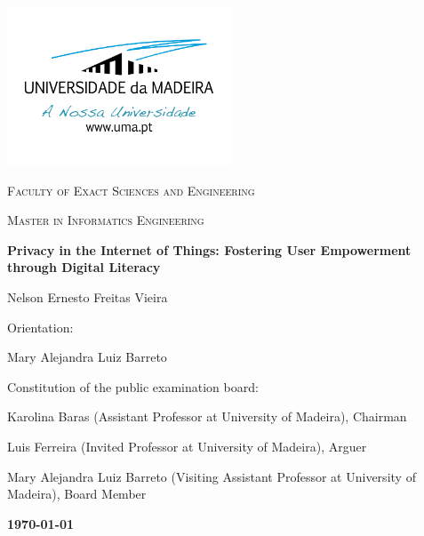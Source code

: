 %
%
\begin{titlepage}
    \centering
    \addtolength{\hoffset}{0.5cm}
    \centering
    \includegraphics[width=0.50\textwidth]{assets/images/uma_logo.png}\par\vspace{0.5cm}
    {\scshape\LARGE {} Faculty of Exact Sciences and Engineering \par}
    \vspace{1cm}
    {\scshape\Large Master in Informatics Engineering \par}
    \vspace{1.5cm}
    {\huge\bfseries Privacy in the Internet of Things: Fostering User Empowerment through Digital Literacy \par}
    \vspace{2cm}
    {\Large Nelson Ernesto Freitas Vieira\par}
    \vfill
    {\large Orientation: \par}
        Mary Alejandra Luiz Barreto\par
    \vfill
    {\large Constitution of the public examination board: \par}
        Karolina Baras (Assistant Professor at University of Madeira), Chairman \par
        Luis Ferreira (Invited Professor at University of Madeira), Arguer \par
        Mary Alejandra Luiz Barreto (Visiting Assistant Professor at University of Madeira), Board Member \par
    \vfill
    {\large \bfseries \today \par}
\end{titlepage}
